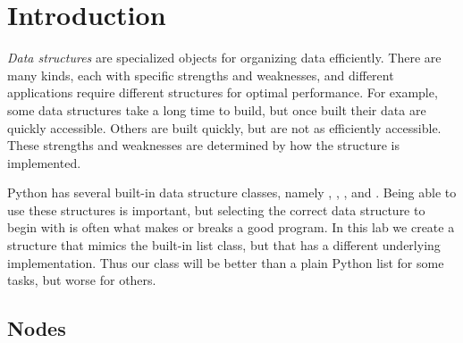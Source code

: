 \label{lab:Python_DataStructures}



\section*{Introduction} %

\emph{Data structures} are specialized objects for organizing data efficiently.
There are many kinds, each with specific strengths and weaknesses, and different applications require different structures for optimal performance.
For example, some data structures take a long time to build, but once built their data are quickly accessible.
Others are built quickly, but are not as efficiently accessible.
These strengths and weaknesses are determined by how the structure is implemented.

Python has several built-in data structure classes, namely , , , and .
Being able to use these structures is important, but selecting the correct data structure to begin with is often what makes or breaks a good program.
In this lab we create a structure that mimics the built-in list class, but that has a different underlying implementation.
Thus our class will be better than a plain Python list for some tasks, but worse for others.

\subsection*{Nodes} %

